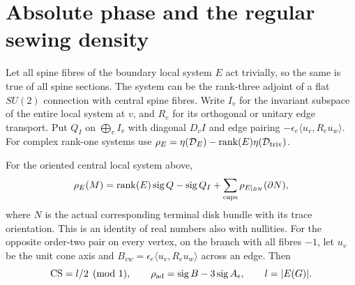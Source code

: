 \section{Absolute phase and the regular sewing density}\label{sec:APS}

Let all spine fibres of the boundary local system \(E\) act trivially, so the same is true of all spine sections. The system can be the rank-three adjoint of a flat \(SU(2)\) connection with central spine fibres. Write \(I_v\) for the invariant subspace of the entire local system at \(v\), and \(R_e\) for its orthogonal or unitary edge transport. Put \(Q_I\) on \(\bigoplus_v I_v\) with diagonal \(D_v I\) and edge pairing \(-\epsilon_e\langle u_v,R_eu_w\rangle\). For complex rank-one systems use \(\rho_E=\eta({\cal D}_E)-\operatorname{rank}(E)\eta({\cal D}_{\rm triv})\).

\begin{proposition}\label{prop:aps}
For the oriented central local system above,
\begin{equation}\label{eq:deletion}
 \rho_E(M) = \operatorname{rank}(E)\operatorname{sig} Q-\operatorname{sig} Q_I+
             \sum_{\text{caps}}\rho_{E|_{\partial N}}(\partial N),
\end{equation}
where \(N\) is the actual corresponding terminal disk bundle with its trace orientation. This is an identity of real numbers also with nullities.
For the opposite order-two pair on every vertex, on the branch with all fibres \(-1\), let \(u_v\) be the unit cone axis and \(B_{vw}=\epsilon_e\langle u_v,R_eu_w\rangle\) across an edge. Then
\begin{equation}\label{eq:pairedaps}
 \operatorname{CS}=l/2\pmod1,\qquad \rho_{\rm ad}=\operatorname{sig} B-3\operatorname{sig} A_\epsilon,\qquad l=|E(G)|.
\end{equation}
\end{proposition}

